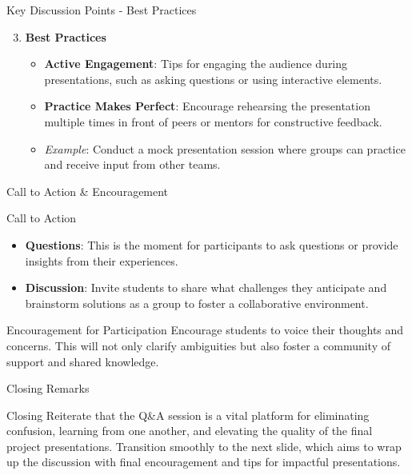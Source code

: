 \documentclass[aspectratio=169]{beamer}
\begin{document}
\begin{frame}[fragile]{Key Discussion Points - Best Practices}
    \begin{enumerate}
        \setcounter{enumi}{2}
        \item \textbf{Best Practices}
        \begin{itemize}
            \item \textbf{Active Engagement}: Tips for engaging the audience during presentations, such as asking questions or using interactive elements.
            \item \textbf{Practice Makes Perfect}: Encourage rehearsing the presentation multiple times in front of peers or mentors for constructive feedback.
            \item \textit{Example}: Conduct a mock presentation session where groups can practice and receive input from other teams.
        \end{itemize}
    \end{enumerate}
\end{frame}

\begin{frame}[fragile]{Call to Action & Encouragement}
    \begin{block}{Call to Action}
        \begin{itemize}
            \item \textbf{Questions}: This is the moment for participants to ask questions or provide insights from their experiences.
            \item \textbf{Discussion}: Invite students to share what challenges they anticipate and brainstorm solutions as a group to foster a collaborative environment.
        \end{itemize}
    \end{block}
    \begin{block}{Encouragement for Participation}
        Encourage students to voice their thoughts and concerns. This will not only clarify ambiguities but also foster a community of support and shared knowledge.
    \end{block}
\end{frame}

\begin{frame}[fragile]{Closing Remarks}
    \begin{block}{Closing}
        Reiterate that the Q\&A session is a vital platform for eliminating confusion, learning from one another, and elevating the quality of the final project presentations. Transition smoothly to the next slide, which aims to wrap up the discussion with final encouragement and tips for impactful presentations.
    \end{block}
\end{frame}
\end{document}
